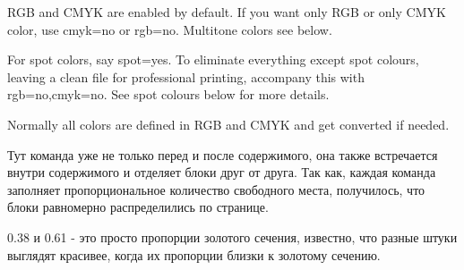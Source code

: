 \page

{\dontleavehmode
  \vfill


  

  \vfill


  

  \vfill

  \startitemize
  \item RGB and CMYK are enabled by default. If you want
    only RGB or only CMYK color, use cmyk=no or
    rgb=no. Multitone colors see below.

  \item For spot colors, say spot=yes. To eliminate
    everything except spot colours, leaving a clean file for
    professional printing, accompany this with
    rgb=no,cmyk=no. See spot colours below for more details.

  \item Normally all colors are defined in RGB and CMYK and
    get converted if needed.
  \stopitemize

  \vfill

}

\page

Тут команда  уже не только перед и после
содержимого, она также встречается внутри содержимого и
отделяет блоки друг от друга. Так как, каждая команда
 заполняет пропорциональное количество свободного
места, получилось, что блоки равномерно распределились по
странице.

0.38 и 0.61 - это просто пропорции золотого сечения,
известно, что разные штуки выглядят красивее, когда их
пропорции близки к золотому сечению.
